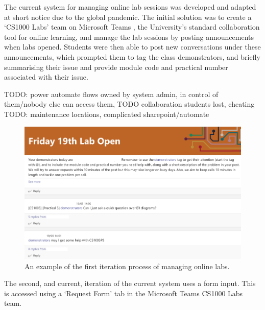The current system for managing online lab sessions was developed and adapted at short notice due to the global pandemic. The initial solution was to create a `CS1000 Labs' team on Microsoft Teams \cite{teams}, the University's standard collaboration tool for online learning, and manage the lab sessions by posting announcements when labs opened. Students were then able to post new conversations under these announcements, which prompted them to tag the class demonstrators, and briefly summarising their issue and provide module code and practical number associated with their issue.

TODO: power automate flows owned by system admin, in control of them/nobody else can access them,
TODO collaboration students lost, cheating
TODO: maintenance locations, complicated sharepoint/automate

\FloatBarrier
\begin{figure}[H]
  \centering
  \includegraphics[width=\textwidth]{2context/images/teams1.png}
  \caption{An example of the first iteration process of managing online labs.}
\end{figure}

The second, and current, iteration of the current system uses a form input. This is accessed using a `Request Form' tab in the Microsoft Teams \cite{teams} CS1000 Labs team. 

